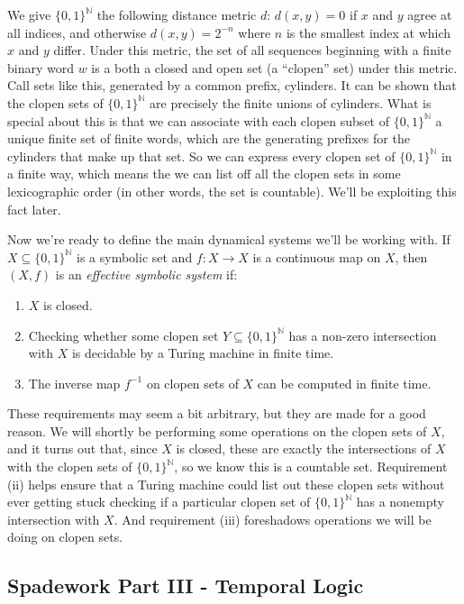 \documentclass{fkpaper}
\renewcommand{\Nn}{\mathbb{N}}
\begin{document}
\begin{multicols}{2}
We give $\{0,1\}^\Nn$ the following distance metric $d$: $d(x,y) = 0$ if $x$ and $y$ agree at all indices, and otherwise $d(x,y) = 2^{-n}$ where $n$ is the smallest index at which $x$ and $y$ differ. Under this metric, the set of all sequences beginning with a finite binary word $w$ is a both a closed and open set (a ``clopen'' set) under this metric. Call sets like this, generated by a common prefix, cylinders. It can be shown that the clopen sets of $\{0,1\}^\Nn$ are precisely the finite unions of cylinders. What is special about this is that we can associate with each clopen subset of $\{0,1\}^\Nn$ a unique finite set of finite words, which are the generating prefixes for the cylinders that make up that set. So we can express every clopen set of $\{0,1\}^\Nn$ in a finite way, which means the we can list off all the clopen sets in some lexicographic order (in other words, the set is countable). We'll be exploiting this fact later.

Now we're ready to define the main dynamical systems we'll be working with. If $X \subseteq \{0,1\}^\Nn$ is a symbolic set and $f: X \to X$ is a continuous map on $X$, then $(X, f)$ is an {\it effective symbolic system} if:
\begin{enumerate}[label=(\roman*)]
  \item $X$ is closed.
  \item Checking whether some clopen set $Y \subseteq \{0,1\}^\Nn$ has a non-zero intersection with $X$ is decidable by a Turing machine in finite time.
  \item The inverse map $f^{-1}$ on clopen sets of $X$ can be computed in finite time.
\end{enumerate}

These requirements may seem a bit arbitrary, but they are made for a good reason. We will shortly be performing some operations on the clopen sets of $X$, and it turns out that, since $X$ is closed, these are exactly the intersections of $X$ with the clopen sets of $\{0,1\}^\Nn$, so we know this is a countable set. Requirement (ii) helps ensure that a Turing machine could list out these clopen sets without ever getting stuck checking if a particular clopen set of $\{0,1\}^\Nn$ has a nonempty intersection with $X$. And requirement (iii) foreshadows operations we will be doing on clopen sets.

\subsection{Spadework Part III - Temporal Logic}


\end{multicols}
\end{document}
